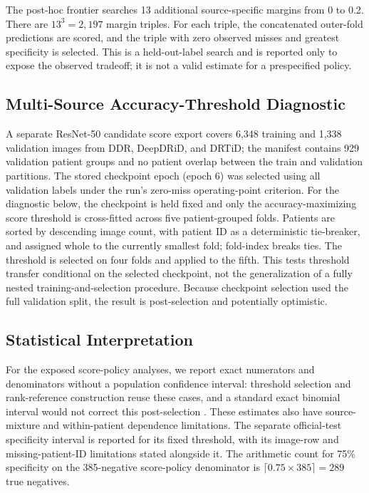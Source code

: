 \documentclass{ieeeaccess}
\begin{document}
The post-hoc frontier searches 13 additional source-specific margins from 0 to 0.2. There are $13^3=2{,}197$ margin triples. For each triple, the concatenated outer-fold predictions are scored, and the triple with zero observed misses and greatest specificity is selected. This is a held-out-label search and is reported only to expose the observed tradeoff; it is not a valid estimate for a prespecified policy.

\subsection{Multi-Source Accuracy-Threshold Diagnostic}
A separate ResNet-50 candidate score export covers 6,348 training and 1,338 validation images from DDR, DeepDRiD, and DRTiD; the manifest contains 929 validation patient groups and no patient overlap between the train and validation partitions. The stored checkpoint epoch (epoch 6) was selected using all validation labels under the run's zero-miss operating-point criterion. For the diagnostic below, the checkpoint is held fixed and only the accuracy-maximizing score threshold is cross-fitted across five patient-grouped folds. Patients are sorted by descending image count, with patient ID as a deterministic tie-breaker, and assigned whole to the currently smallest fold; fold-index breaks ties. The threshold is selected on four folds and applied to the fifth. This tests threshold transfer conditional on the selected checkpoint, not the generalization of a fully nested training-and-selection procedure. Because checkpoint selection used the full validation split, the result is post-selection and potentially optimistic.

\subsection{Statistical Interpretation}
For the exposed score-policy analyses, we report exact numerators and denominators without a population confidence interval: threshold selection and rank-reference construction reuse these cases, and a standard exact binomial interval would not correct this post-selection \cite{clopperpearson,cawley2010}. These estimates also have source-mixture and within-patient dependence limitations. The separate official-test specificity interval is reported for its fixed threshold, with its image-row and missing-patient-ID limitations stated alongside it. The arithmetic count for 75\% specificity on the 385-negative score-policy denominator is $\lceil0.75\times385\rceil=289$ true negatives.
\end{document}

